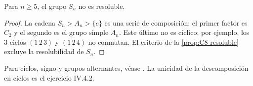 \begin{coro}
Para $n\ge5$, el grupo $S_n$ no es resoluble.
\end{coro}
\begin{proof}
La cadena $S_n>A_n>\{e\}$ es una serie de composición: el primer factor es $C_2$ y el segundo es el grupo simple $A_n$. Este último no es cíclico; por ejemplo, los $3$-ciclos $(1\,2\,3)$ y $(1\,2\,4)$ no conmutan. El criterio de la \cref{prop:C8-resoluble} excluye la resolubilidad de $S_n$.
\end{proof}

\begin{obs}
Para ciclos, signo y grupos alternantes, véase \citet[cap.~IV, 4.1--4/6/8--21]{aluffi2009}. La unicidad de la descomposición en ciclos es el ejercicio IV.4.2.
\end{obs}
